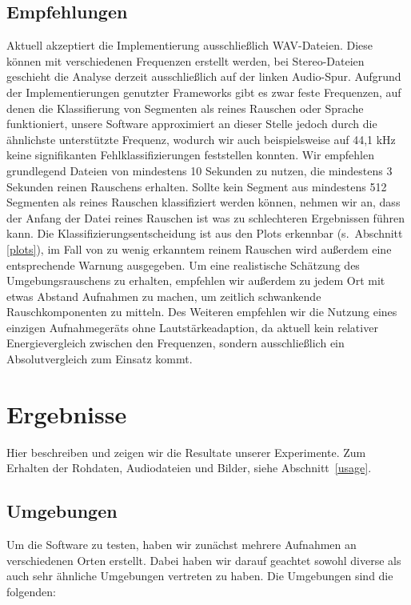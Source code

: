 \documentclass[
	fontsize=10.5pt,
	marginpar=false,
	ngerman,
	accentcolor=3d
	]{tudapub}
\begin{document}
\subsection{Empfehlungen}
Aktuell akzeptiert die Implementierung ausschließlich WAV-Dateien. Diese können mit verschiedenen Frequenzen erstellt werden, bei Stereo-Dateien geschieht die Analyse derzeit ausschließlich auf der linken Audio-Spur. Aufgrund der Implementierungen genutzter Frameworks gibt es zwar feste Frequenzen, auf denen die Klassifierung von Segmenten als reines Rauschen oder Sprache funktioniert, unsere Software approximiert an dieser Stelle jedoch durch die ähnlichste unterstützte Frequenz, wodurch wir auch beispielsweise auf 44,1 kHz keine signifikanten Fehlklassifizierungen feststellen konnten. Wir empfehlen grundlegend Dateien von mindestens 10 Sekunden zu nutzen, die mindestens 3 Sekunden reinen Rauschens erhalten. Sollte kein Segment aus mindestens 512 Segmenten als reines Rauschen klassifiziert werden können, nehmen wir an, dass der Anfang der Datei reines Rauschen ist was zu schlechteren Ergebnissen führen kann. Die Klassifizierungsentscheidung ist aus den Plots erkennbar (s.~Abschnitt \ref{plots}), im Fall von zu wenig erkanntem reinem Rauschen wird außerdem eine entsprechende Warnung ausgegeben. Um eine realistische Schätzung des Umgebungsrauschens zu erhalten, empfehlen wir außerdem zu jedem Ort mit etwas Abstand Aufnahmen zu machen, um zeitlich schwankende Rauschkomponenten zu mitteln. Des Weiteren empfehlen wir die Nutzung eines einzigen Aufnahmegeräts ohne Lautstärkeadaption, da aktuell kein relativer Energievergleich zwischen den Frequenzen, sondern ausschließlich ein Absolutvergleich zum Einsatz kommt.

\pagebreak
{}
\section{Ergebnisse}
\label{reults}

Hier beschreiben und zeigen wir die Resultate unserer Experimente. Zum Erhalten der Rohdaten, Audiodateien und Bilder, siehe Abschnitt~\ref{usage}.

\subsection{Umgebungen}
\label{envs}

Um die Software zu testen, haben wir zunächst mehrere Aufnahmen an verschiedenen Orten erstellt. Dabei haben wir darauf geachtet sowohl diverse als auch sehr ähnliche Umgebungen vertreten zu haben. Die Umgebungen sind die folgenden:
\end{document}
